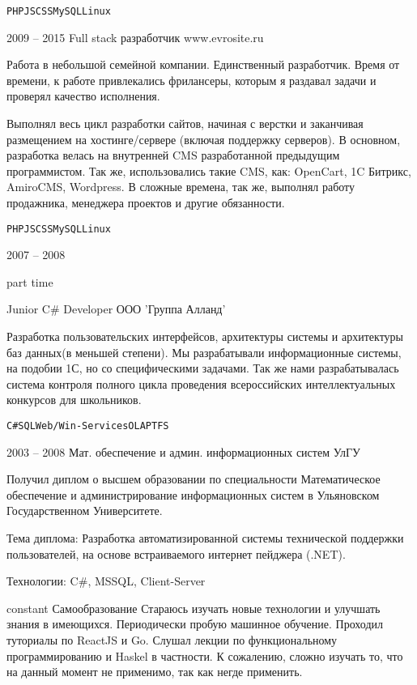 \begin{entrylist}
{		\texttt{PHP}\slashsep\texttt{JS}\slashsep\texttt{CSS}\slashsep\texttt{MySQL}\slashsep\texttt{Linux}}

  \entry
    {2009 -- 2015}
    {Full stack разработчик}
    {www.evrosite.ru}
    {Работа в небольшой семейной компании. Единственный разработчик. Время от времени, к работе привлекались фрилансеры, которым я раздавал задачи и проверял качество исполнения.

    Выполнял весь цикл разработки сайтов, начиная с верстки и заканчивая размещением на хостинге/сервере (включая поддержку серверов). В основном, разработка велась на внутренней CMS разработанной предыдущим программистом. Так же, использовались такие CMS, как: OpenCart, 1C Битрикс, AmiroCMS, Wordpress. В сложные времена, так же, выполнял работу продажника, менеджера проектов и другие обязанности.

    \texttt{PHP}\slashsep\texttt{JS}\slashsep\texttt{CSS}\slashsep\texttt{MySQL}\slashsep\texttt{Linux}}

	\entry
		{2007 -- 2008

		\footnotesize{part time}}
		{Junior C\# Developer}
		{ООО 'Группа Алланд'}
		{Разработка пользовательских интерфейсов, архитектуры системы и архитектуры баз данных(в меньшей степени). Мы разрабатывали информационные системы, на подобии 1С, но со специфическими задачами. Так же нами разрабатывалась система контроля полного цикла проведения всероссийских интеллектуальных конкурсов для школьников.

		\texttt{C\#}\slashsep\texttt{SQL}\slashsep\texttt{Web/Win-Services}\slashsep\texttt{OLAP}\slashsep\texttt{TFS}}

\end{entrylist}



\begin{entrylist}
	\entry
		{2003 -- 2008}
		{Мат. обеспечение и админ. информационных систем}
		{УлГУ}
		{Получил диплом о высшем образовании по специальности Математическое обеспечение и администрирование информационных систем в Ульяновском Государственном Университете.

		Тема диплома: Разработка автоматизированной системы технической поддержки пользователей, на основе встраиваемого интернет пейджера (.NET).

		Технологии: C\#, MSSQL, Client-Server
		}
	\entry
		{constant}
		{Самообразование}
		{}
		{Стараюсь изучать новые технологии и улучшать знания в имеющихся. Периодически пробую машинное обучение. Проходил туториалы по ReactJS и Go. Слушал лекции по функциональному программированию и Haskel в частности. К сожалению, сложно изучать то, что на данный момент не применимо, так как негде применить. }
\end{entrylist}

